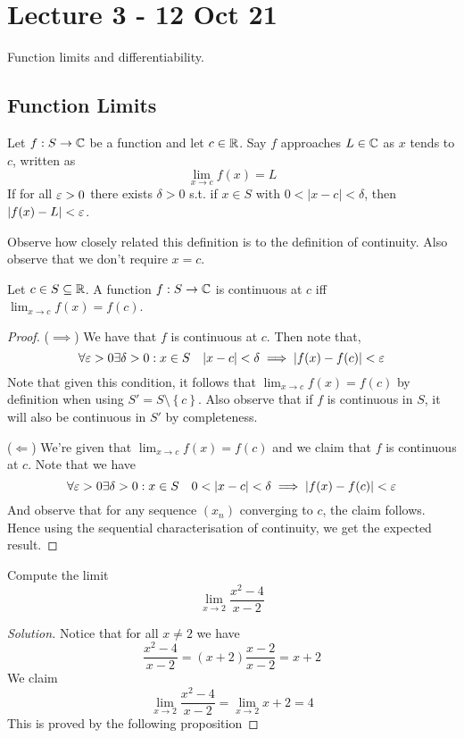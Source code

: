 \section{Lecture 3 - 12 Oct 21}
Function limits and differentiability.
\subsection{Function Limits}
\begin{definition}
  Let $f:S\to\mathbb C$  be a function and let $c\in\mathbb R$. Say $f$ approaches $L\in\mathbb C$ as $x$
  tends to $c$, written as 
  \[\lim_{x\to c} f(x) = L\]
  If for all $\varepsilon>0$ there exists $\delta>0$ s.t. if $x\in S$ with $0<|x-c|<\delta$, then
  $|f(x)-L|<\varepsilon$.
  \label{def:functionLimit}
\end{definition}
Observe how closely related this definition is to the definition of continuity. Also
observe that we don't require $x=c$.
\begin{theorem}
  Let $c\in S\subseteq \mathbb R$. A function $f:S\to\mathbb C$ is continuous at $c$ iff
  $\lim_{x\to c}f(x)=f(c)$.
\end{theorem}
\begin{proof}
  ($\implies$) We have that $f$ is continuous at $c$. Then note that,
  \[\forall\varepsilon>0\exists\delta>0 : x\in S \quad |x-c|<\delta \implies|f(x)-f(c)|<\varepsilon\]
  Note that given this condition, it follows that $\lim_{x\to c} f(x)=f(c)$ by definition
  when using $S'=S\setminus \left\{ c \right\}$. Also observe that if $f$ is continuous in
  $S$, it will also be continuous in $S'$ by completeness.

  ($\Leftarrow$) We're given that $\lim_{x\to c} f(x)=f(c)$ and we claim that $f$ is
  continuous at $c$. Note that we have
  \[\forall\eps>0\exists\delta>0 : x\in S \quad 0<|x-c|<\delta \implies|f(x)-f(c)|<\eps\]
  And observe that for any sequence $(x_n)$ converging to $c$, the claim follows. Hence
  using the sequential characterisation of continuity, we get the expected result.
\end{proof}

\begin{example}
  Compute the limit
  \[\lim_{x\to 2} \frac{x^2-4}{x-2}\]
\end{example}
\begin{proof}[Solution]
  Notice that for all $x\neq 2$ we have
  \[\frac{x^2-4}{x-2} = (x+2) \frac{x-2}{x-2} = x+2\]
  We claim 
  \[\lim_{x\to 2} \frac{x^2-4}{x-2} = \lim_{x\to 2} x+2 = 4\]
  This is proved by the following proposition
\end{proof}

